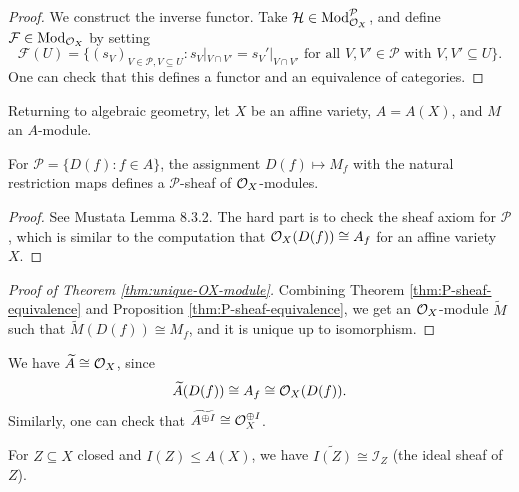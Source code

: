 \begin{proof}
  We construct the inverse functor.
  Take
  $\mathcal{H} \in \mathrm{Mod}_{\mathcal{O}_X}^{\mathcal{P}}$, and
  define $\mathcal{F} \in \mathrm{Mod}_{\mathcal{O}_X}$
  by setting
  \[
    \mathcal{F}(U)
    = \{(s_V)_{V \in \mathcal{P}, V \subseteq U} : s_V|_{V \cap V'} = s_V'|_{V \cap V'} \text{ for all } V, V' \in \mathcal{P} \text{ with } V, V' \subseteq U\}.
  \]
  One can check that this defines a
  functor and an equivalence of categories.
\end{proof}

\begin{remark}
  Returning to algebraic geometry,
  let $X$ be an affine variety,
  $A = A(X)$, and $M$ an $A$-module.
\end{remark}

\begin{prop}\label{prop:P-sheaf-from-module}
  For $\mathcal{P} = \{D(f) : f \in A\}$,
  the assignment $D(f) \mapsto M_f$
  with the natural restriction maps
  defines a $\mathcal{P}$-sheaf of $\mathcal{O}_X$-modules.
\end{prop}

\begin{proof}
  See Mustata Lemma 8.3.2.
  The hard part is to check the
  sheaf axiom for $\mathcal{P}$, which
  is similar to the computation
  that $\mathcal{O}_X(D(f)) \cong A_f$
  for an affine variety $X$.
\end{proof}

\begin{proof}[Proof of Theorem \ref{thm:unique-OX-module}]
  Combining
  Theorem \ref{thm:P-sheaf-equivalence}
  and Proposition
  \ref{thm:P-sheaf-equivalence},
  we get an $\mathcal{O}_X$-module
  $\widetilde{M}$ such that
  $\widetilde{M}(D(f)) \cong M_f$,
  and it is unique up to isomorphism.
\end{proof}

\begin{example}
  We have
  $\widetilde{A} \cong \mathcal{O}_X$, since
  \[
    \widetilde{A}(D(f))
    \cong A_f \cong \mathcal{O}_X(D(f)).
  \]
  Similarly, one can check that
  $\widetilde{A^{\oplus I}} \cong \mathcal{O}_X^{\oplus I}$.
\end{example}

\begin{exercise}
  For $Z \subseteq X$ closed and
  $I(Z) \le A(X)$, we have
  $\widetilde{I(Z)} \cong \mathcal{I}_Z$ (the ideal sheaf of $Z$).
\end{exercise}

